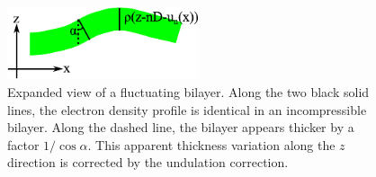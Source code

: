 \begin{figure}[htbp]
  \centering
  \includegraphics[width=0.5\textwidth]{figures/Tat/stack2}
  \caption{Expanded view of a fluctuating bilayer. Along the two black solid
  lines, the electron density profile is identical in an incompressible 
  bilayer. Along the dashed line, the bilayer appears thicker by a factor
  $1/\cos\alpha$. This apparent thickness variation along the $z$ direction 
  is corrected by the undulation correction.}
  \label{fig:stack2}
\end{figure}

